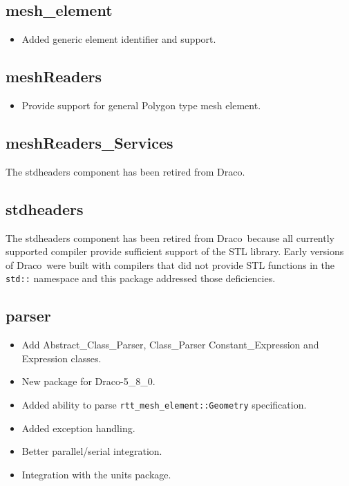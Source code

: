 \documentclass[note]{ResearchNote}
\newcommand{\draco}{Draco}
\begin{document}
\subsection{mesh\_element}
\label{changes:mes-element}
\begin{itemize}
\item Added generic element identifier and support.
\end{itemize}

\subsection{meshReaders}
\label{changes:meshReaders}
\begin{itemize}
\item Provide support for general Polygon type mesh element.
\end{itemize}

\subsection{meshReaders\_Services}
\label{changes:meshReaders-Services}
The stdheaders component has been retired from \draco.

\subsection{stdheaders}
\label{changes:stdheaders}
The stdheaders component has been retired from \draco\ because all
currently supported compiler provide sufficient support of the STL
library.  Early versions of \draco\ were built with compilers that did
not provide STL functions in the \texttt{std::} namespace and this
package addressed those deficiencies.

\subsection{parser}
\label{changes:parser}
\begin{itemize}
\item Add \textsf{Abstract\_Class\_Parser}, \textsf{Class\_Parser}
  \textsf{Constant\_Expression} and \textsf{Expression} classes.
\item New package for \draco-5\_8\_0.
\item Added ability to parse \texttt{rtt\_mesh\_element::Geometry}
  specification. 
\item Added exception handling.
\item Better parallel/serial integration.
\item Integration with the \textsf{units} package.
\end{itemize}
\end{document}
